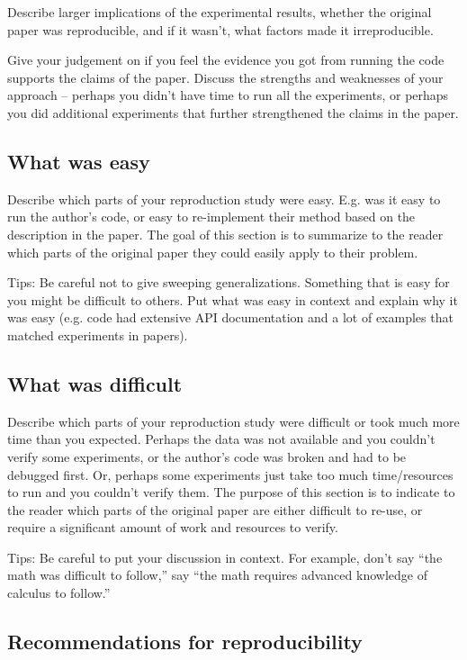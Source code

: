 \documentclass[11pt,a4paper]{article}
\begin{document}
Describe larger implications of the experimental results, whether the original paper was reproducible, and if it wasn’t, what factors made it irreproducible. 

Give your judgement on if you feel the evidence you got from running the code supports the claims of the paper. Discuss the strengths and weaknesses of your approach -- perhaps you didn't have time to run all the experiments, or perhaps you did additional experiments that further strengthened the claims in the paper.

\subsection{What was easy}
Describe which parts of your reproduction study were easy. E.g. was it easy to run the author's code, or easy to re-implement their method based on the description in the paper. The goal of this section is to summarize to the reader which parts of the original paper they could easily apply to their problem. 

Tips: Be careful not to give sweeping generalizations. Something that is easy for you might be difficult to others. Put what was easy in context and explain why it was easy (e.g. code had extensive API documentation and a lot of examples that matched experiments in papers). 

\subsection{What was difficult}
Describe which parts of your reproduction study were difficult or took much more time than you expected. Perhaps the data was not available and you couldn't verify some experiments, or the author's code was broken and had to be debugged first. Or, perhaps some experiments just take too much time/resources to run and you couldn't verify them. The purpose of this section is to indicate to the reader which parts of the original paper are either difficult to re-use, or require a significant amount of work and resources to verify. 

Tips: Be careful to put your discussion in context. For example, don't say ``the math was difficult to follow,'' say ``the math requires advanced knowledge of calculus to follow.'' 

\subsection{Recommendations for reproducibility}
\end{document}
